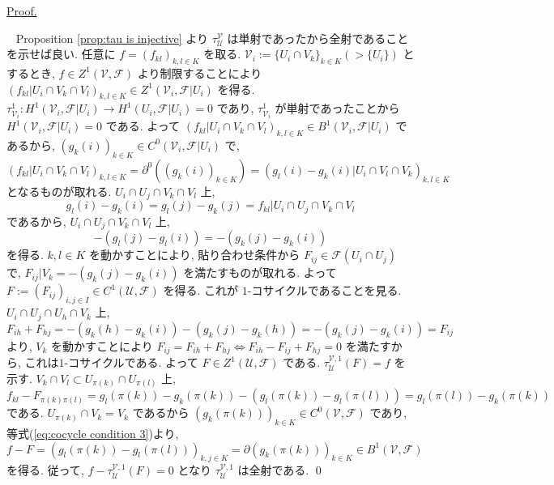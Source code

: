 \documentclass[a4paper,10pt,dvipdfmx]{jsreport}
\renewenvironment{proof}{\begin{flushleft} \underline{Proof.} \end{flushleft}\vspace{-1zh}\ }{\qed\\}
\theoremstyle{definition}
\begin{document}
\begin{proof}
    Proposition \ref{prop:tau is injective} より \(\tau_\mathcal{U}^\mathcal{V}\) は単射であったから全射であることを示せば良い. 任意に \(f= (f_{kl})_{k,l\in K}\) を取る. \(\mathcal{V}_i := \{U_i \cap V_k\}_{k\in K}(>\{U_i\})\) とするとき, \(f\in Z^1(\mathcal{V},\mathscr{F})\) より制限することにより \((f_{kl}|U_i \cap V_k \cap V_l)_{k,l\in K} \in Z^1(\mathcal{V}_i,\mathscr{F}|U_i)\) を得る. \(\tau_{\mathcal{V}_i}^1 \colon H^1(\mathcal{V}_i,\mathscr{F}|U_i) \to H^1(U_i,\mathscr{F}|U_i) = 0\) であり, \(\tau_{\mathcal{V}_i}^1\) が単射であったことから \(H^1(\mathcal{V}_i,\mathscr{F}|U_i) = 0\) である. よって \((f_{kl}|U_i \cap V_k \cap V_l)_{k,l\in K} \in B^1(\mathcal{V}_i, \mathscr{F}|U_i)\) であるから, \((g_k(i))_{k\in K} \in C^0(\mathcal{V}_i, \mathscr{F}|U_i)\) で,
    \[
        (f_{kl}|U_i \cap V_k \cap V_l)_{k,l\in K} = \partial^0((g_k(i))_{k\in K} ) = (g_l(i) - g_k(i)|U_i\cap V_l \cap V_k)_{k,l\in K}
    \]
    となるものが取れる. \(U_i \cap U_j \cap V_k \cap V_l\) 上,
    \[
        g_l(i)-g_k(i) = g_l(j)-g_k(j) = f_{kl}|U_i \cap U_j \cap V_k \cap V_l
    \]
    であるから, \(U_i \cap U_j \cap V_k \cap V_l\) 上,
    \[
        -(g_l(j) - g_l (i)) = -(g_k(j) - g_k(i))
    \]
    を得る. \(k,l\in K\) を動かすことにより, 貼り合わせ条件から \(F_{ij} \in \mathscr{F}(U_{i}\cap U_j)\) で, \(F_{ij}|V_k = -(g_k(j) - g_k(i))\) を満たすものが取れる. よって \(F:=(F_{ij})_{i,j\in I}\in C^1(\mathcal{U},\mathscr{F})\) を得る. これが \(1\)-コサイクルであることを見る. \(U_i \cap U_j \cap U_h \cap V_k\) 上,
    \[
        F_{ih} + F_{hj} = -(g_k(h)-g_k(i))-(g_k(j)-g_k(h)) = -(g_k(j)-g_k(i)) = F_{ij}
    \]
    より, \(V_k\) を動かすことにより \(F_{ij} = F_{ih} + F_{hj} \iff F_{ih} - F_{ij} +F_{hj} = 0\) を満たすから, これは\(1\)-コサイクルである. よって \(F\in Z^1(\mathcal{U},\mathscr{F})\) である. \(\tau_\mathcal{U}^{\mathcal{V},1}(F) = f\) を示す. \(V_k \cap V_l \subset U_{\pi(k)} \cap U_{\pi(l)}\) 上,
    \begin{equation}
        f_{kl}-F_{\pi(k)\pi(l)} = g_{l}(\pi(k))-g_{k}(\pi(k))-(g_l (\pi(k)) - g_l(\pi(l))) = g_l(\pi(l)) - g_k(\pi(k)) \label{eq:cocycle condition 3}
    \end{equation}
    である. \(U_{\pi(k)} \cap V_k = V_k\) であるから \((g_k(\pi(k)))_{k\in K} \in C^0(\mathcal{V},\mathscr{F})\) であり, 等式(\ref{eq:cocycle condition 3})より,
    \[
        f-F = (g_l(\pi(k)) - g_l(\pi(l)))_{k,j\in K} =\partial (g_k(\pi(k)))_{k\in K} \in B^1(\mathcal{V},\mathscr{F})
    \]
    を得る. 従って, \(f-\tau_\mathcal{U}^{\mathcal{V},1}(F) = 0\) となり \(\tau_\mathcal{U}^{\mathcal{V},1}\) は全射である.
\end{proof}
\end{document}

